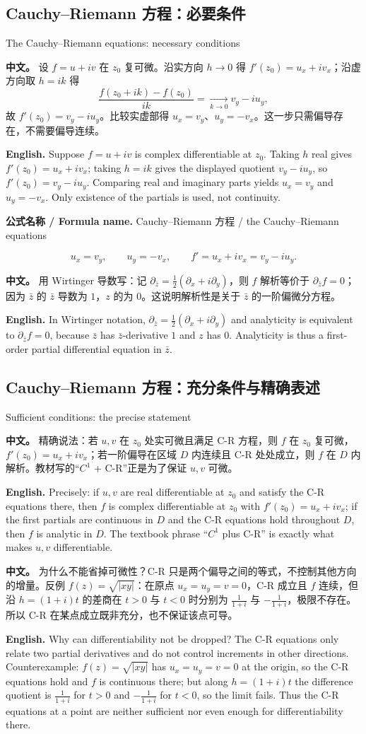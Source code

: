 \documentclass[UTF8,11pt,a4paper]{ctexart}
\newcommand{\FORMULA}[2]{\par\noindent\textbf{公式名称 / Formula name.} #1 / #2\par}
\newcommand{\APS}[2]{\par\noindent\textbf{中文。} #1\par\noindent\textbf{English.} #2\par\smallskip}
\begin{document}
\subsection{Cauchy--Riemann 方程：必要条件}{The Cauchy--Riemann equations: necessary conditions}
\APS{设 $f=u+iv$ 在 $z_0$ 复可微。沿实方向 $h\to0$ 得 $f'(z_0)=u_x+iv_x$；沿虚方向取 $h=ik$ 得
\[
\frac{f(z_0+ik)-f(z_0)}{ik}=\xrightarrow[k\to0]{}v_y-iu_y,
\]
故 $f'(z_0)=v_y-iu_y$。比较实虚部得 $u_x=v_y$、$u_y=-v_x$。这一步只需偏导存在，不需要偏导连续。}{Suppose $f=u+iv$ is complex differentiable at $z_0$. Taking $h$ real gives $f'(z_0)=u_x+iv_x$; taking $h=ik$ gives the displayed quotient $v_y-iu_y$, so $f'(z_0)=v_y-iu_y$. Comparing real and imaginary parts yields $u_x=v_y$ and $u_y=-v_x$. Only existence of the partials is used, not continuity.}
\FORMULA{Cauchy--Riemann 方程}{the Cauchy--Riemann equations}
\[
u_x=v_y,\qquad u_y=-v_x,\qquad f'=u_x+iv_x=v_y-iu_y.
\]
\APS{用 Wirtinger 导数写：记 $\partial_{\bar z}=\frac12(\partial_x+i\partial_y)$，则 $f$ 解析等价于 $\partial_{\bar z}f=0$；因为 $\bar z$ 的 $\bar z$ 导数为 $1$，$z$ 的为 $0$。这说明解析性是关于 $\bar z$ 的一阶偏微分方程。}{In Wirtinger notation, $\partial_{\bar z}=\frac12(\partial_x+i\partial_y)$ and analyticity is equivalent to $\partial_{\bar z}f=0$, because $\bar z$ has $\bar z$-derivative $1$ and $z$ has $0$. Analyticity is thus a first-order partial differential equation in $\bar z$.}

\subsection{Cauchy--Riemann 方程：充分条件与精确表述}{Sufficient conditions: the precise statement}
\APS{精确说法：若 $u,v$ 在 $z_0$ 处实可微且满足 C-R 方程，则 $f$ 在 $z_0$ 复可微，$f'(z_0)=u_x+iv_x$；若一阶偏导在区域 $D$ 内连续且 C-R 处处成立，则 $f$ 在 $D$ 内解析。教材写的“$C^1$ + C-R”正是为了保证 $u,v$ 可微。}{Precisely: if $u,v$ are real differentiable at $z_0$ and satisfy the C-R equations there, then $f$ is complex differentiable at $z_0$ with $f'(z_0)=u_x+iv_x$; if the first partials are continuous in $D$ and the C-R equations hold throughout $D$, then $f$ is analytic in $D$. The textbook phrase ``$C^1$ plus C-R'' is exactly what makes $u,v$ differentiable.}
\APS{为什么不能省掉可微性？C-R 只是两个偏导之间的等式，不控制其他方向的增量。反例 $f(z)=\sqrt{|xy|}$：在原点 $u_x=u_y=v=0$，C-R 成立且 $f$ 连续，但沿 $h=(1+i)t$ 的差商在 $t>0$ 与 $t<0$ 时分别为 $\frac{1}{1+i}$ 与 $-\frac{1}{1+i}$，极限不存在。所以 C-R 在某点成立既非充分，也不保证该点可导。}{Why can differentiability not be dropped? The C-R equations only relate two partial derivatives and do not control increments in other directions. Counterexample: $f(z)=\sqrt{|xy|}$ has $u_x=u_y=v=0$ at the origin, so the C-R equations hold and $f$ is continuous there; but along $h=(1+i)t$ the difference quotient is $\frac{1}{1+i}$ for $t>0$ and $-\frac{1}{1+i}$ for $t<0$, so the limit fails. Thus the C-R equations at a point are neither sufficient nor even enough for differentiability there.}
\end{document}
